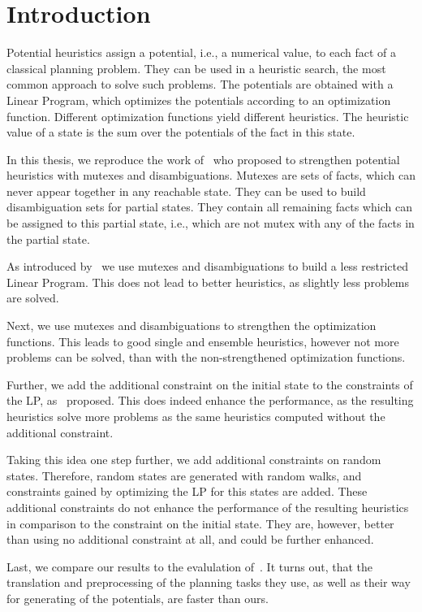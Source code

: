 \chapter{Introduction}\label{ch:introduction}

Potential heuristics assign a potential, i.e., a numerical value, to each fact of a classical planning problem.
They can be used in a heuristic search, the most common approach to solve such problems.
The potentials are obtained with a Linear Program, which optimizes the potentials according to an optimization function.
Different optimization functions yield different heuristics.
The heuristic value of a state is the sum over the potentials of the fact in this state.

In this thesis, we reproduce the work of~\citeauthor{fivser2020strengthening} who proposed to strengthen potential heuristics with mutexes and disambiguations.
Mutexes are sets of facts, which can never appear together in any reachable state.
They can be used to build disambiguation sets for partial states.
They contain all remaining facts which can be assigned to this partial state, i.e., which are not mutex with any of the facts in the partial state.

As introduced by~\citeauthor{fivser2020strengthening} we use mutexes and disambiguations to build a less restricted Linear Program.
This does not lead to better heuristics, as slightly less problems are solved.

Next, we use mutexes and disambiguations to strengthen the optimization functions.
This leads to good single and ensemble heuristics, however not more problems can be solved, than with the non-strengthened optimization functions.

Further, we add the additional constraint on the initial state to the constraints of the LP, as~\citeauthor{fivser2020strengthening} proposed.
This does indeed enhance the performance, as the resulting heuristics solve more problems as the same heuristics computed without the additional constraint.

Taking this idea one step further, we add additional constraints on random states.
Therefore, random states are generated with random walks, and constraints gained by optimizing the LP for this states are added.
These additional constraints do not enhance the performance of the resulting heuristics in comparison to the constraint on the initial state.
They are, however, better than using no additional constraint at all, and could be further enhanced.

Last, we compare our results to the evalulation of~\citeauthor{fivser2020strengthening}.
It turns out, that the translation and preprocessing of the planning tasks they use, as well as their way for generating of the potentials, are faster than ours.